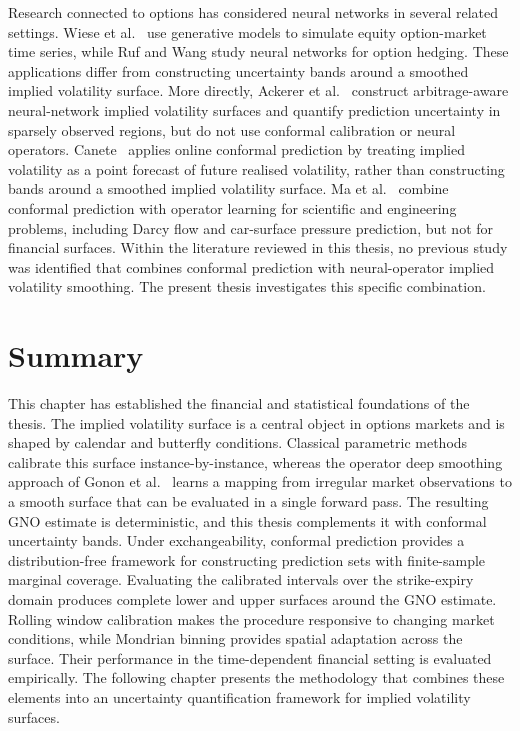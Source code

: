 Research connected to options has considered neural networks in several related settings. Wiese et al.\ \cite{wiese2019deep} use generative models to simulate equity option-market time series, while Ruf and Wang \cite{ruf2020hedging} study neural networks for option hedging. These applications differ from constructing uncertainty bands around a smoothed implied volatility surface. More directly, Ackerer et al.\ \cite{ackerer2020deep} construct arbitrage-aware neural-network implied volatility surfaces and quantify prediction uncertainty in sparsely observed regions, but do not use conformal calibration or neural operators. Canete~\cite{canete2023market} applies online conformal prediction by treating implied volatility as a point forecast of future realised volatility, rather than constructing bands around a smoothed implied volatility surface. Ma et al.\ \cite{ma2024calibrated} combine conformal prediction with operator learning for scientific and engineering problems, including Darcy flow and car-surface pressure prediction, but not for financial surfaces. Within the literature reviewed in this thesis, no previous study was identified that combines conformal prediction with neural-operator implied volatility smoothing. The present thesis investigates this specific combination.

\section{Summary}
\label{sec:lit_summary}

This chapter has established the financial and statistical foundations of the thesis. The implied volatility surface is a central object in options markets and is shaped by calendar and butterfly conditions. Classical parametric methods calibrate this surface instance-by-instance, whereas the operator deep smoothing approach of Gonon et al.\ \cite{gonon2024operator} learns a mapping from irregular market observations to a smooth surface that can be evaluated in a single forward pass. The resulting GNO estimate is deterministic, and this thesis complements it with conformal uncertainty bands. Under exchangeability, conformal prediction provides a distribution-free framework for constructing prediction sets with finite-sample marginal coverage. Evaluating the calibrated intervals over the strike-expiry domain produces complete lower and upper surfaces around the GNO estimate. Rolling window calibration makes the procedure responsive to changing market conditions, while Mondrian binning provides spatial adaptation across the surface. Their performance in the time-dependent financial setting is evaluated empirically. The following chapter presents the methodology that combines these elements into an uncertainty quantification framework for implied volatility surfaces.

